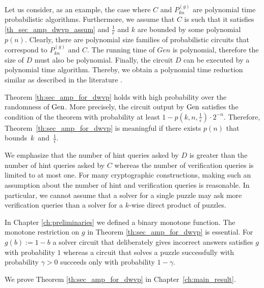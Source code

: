 Let us consider, as an example, the case where $C$ and $P_{kn}^{(g)}$ are polynomial time probabilistic algorithms.
Furthermore, we assume that $C$ is such that it satisfies \eqref{th_sec_amp_dwvp_assum}
and $\frac{1}{\epsilon}$ and $k$ are bounded by some polynomial $p(n)$.
Clearly, there are polynomial size families of probabilistic circuits that correspond to $P_{kn}^{(g)}$ and $C$.
The running time of $Gen$ is polynomial, therefore the size of $D$ must also be polynomial.
Finally, the circuit $D$ can be executed by a polynomial time algorithm.
Thereby, we obtain a polynomial time reduction similar as described in the literature \cite{Arora:2009:CCM:1540612, LectureNotesCrypo}.

Theorem \ref{th:sec_amp_for_dwvp} holds with high probability over the randomness of $\operatorname{\text{Gen}}$.
More precisely, the circuit output by $\operatorname{\text{Gen}}$ satisfies the condition of the theorem with probability
at least $1 - p(k, n, \frac{1}{\epsilon}) \cdot 2^{-n}$. Therefore, Theorem~\ref{th:sec_amp_for_dwvp} is meaningful if there exists $p(n)$
that bounds~$k$~and~$\frac{1}{\epsilon}$.

We emphasize that the number of hint queries asked by $D$ is greater than the number of hint queries asked by $C$ whereas the number of verification queries
is limited to at most one. For many cryptographic constructions, making such an assumption about the number of hint and verification queries is reasonable.
In particular, we cannot assume that a solver for a single puzzle may ask more verification queries than a solver for a $k$-wise direct product of puzzles.

In Chapter \ref{ch:preliminaries} we defined a binary monotone function.
The monotone restriction on $g$ in Theorem \ref{th:sec_amp_for_dwvp} is essential. For $g(b) := 1 - b$ a solver circuit that deliberately gives incorrect
answers satisfies $g$ with probability $1$ whereas a circuit that solves a puzzle successfully with probability
$\gamma > 0$ succeeds only with probability $1 - \gamma$.

We prove Theorem \ref{th:sec_amp_for_dwvp} in Chapter~\ref{ch:main_result}.


